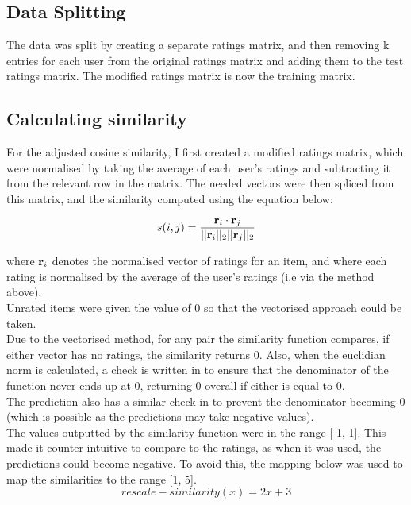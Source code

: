 \documentclass{scrartcl}
\begin{document}
\subsection{Data Splitting}
The data was split by creating a separate ratings matrix, and then removing k entries for each user from the original ratings matrix and adding them to the test ratings matrix. The modified ratings matrix is now the training matrix. \\

\subsection{Calculating similarity}

For the adjusted cosine similarity, I first created a modified ratings matrix, which were normalised by taking the average of each user's ratings and subtracting it from the relevant row in the matrix. The needed vectors were then spliced from this matrix, and the similarity computed using the equation below:

\begin{equation} \label{eq:1}
s(i, j) = \frac{{\mathbf r}_i \cdot {\mathbf r}_j} {|| {\mathbf r}_i ||_2 || {\mathbf r}_j ||_2}
\end{equation}

where ${\mathbf r}_i$ denotes the normalised vector of ratings for an item, and where each rating is normalised by the average of the user's ratings (i.e via the method above). \\

Unrated items were given the value of 0 so that the vectorised approach could be taken.\\

Due to the vectorised method, for any pair the similarity function compares, if either vector has no ratings, the similarity returns 0. Also, when the euclidian norm is calculated, a check is written in to ensure that the denominator of the function never ends up at 0, returning 0 overall if either is equal to 0.\\

The prediction also has a similar check in to prevent the denominator becoming 0 (which is possible as the predictions may take negative values). \\

The values outputted by the similarity function were in the range [-1, 1]. This made it counter-intuitive to compare to the ratings, as when it was used, the predictions could become negative. To avoid this, the mapping below was used to map the similarities to the range [1, 5].
\begin{equation}
    rescale-similarity(x) = 2x + 3
\end{equation}
\end{document}
